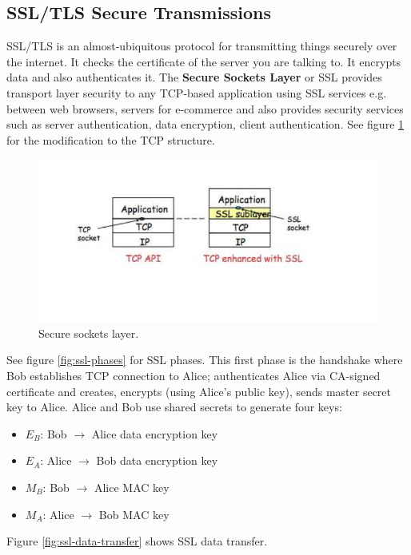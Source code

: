 \documentclass[twoside]{article}
\begin{document}
\subsection{SSL/TLS Secure Transmissions}
SSL/TLS is an almost-ubiquitous protocol for transmitting things securely over
the internet. It checks the certificate of the server you are talking to. It 
encrypts data and also authenticates it. The \textbf{Secure Sockets Layer} or
SSL provides transport layer security to any TCP-based application using SSL
services e.g. between web browsers, servers for e-commerce and also provides
security services such as server authentication, data encryption, client 
authentication. See figure \ref{fig:ssl} for the modification to the TCP 
structure.
\begin{figure}
  \includegraphics[width=\linewidth]{ssl.png}
  \caption{Secure sockets layer.}
  \label{fig:ssl}
\end{figure}
See figure \ref{fig:ssl-phases} for SSL phases. This first phase is the 
handshake where Bob establishes TCP connection to Alice; authenticates Alice
via CA-signed certificate and creates, encrypts (using Alice's public key),
sends master secret key to Alice. Alice and Bob use shared secrets to generate
four keys:
\begin{itemize}
    \item \(E_B\): Bob \(\rightarrow\) Alice data encryption key
    \item \(E_A\): Alice \(\rightarrow\) Bob data encryption key
    \item \(M_B\): Bob \(\rightarrow\) Alice MAC key
    \item \(M_A\): Alice \(\rightarrow\) Bob MAC key
\end{itemize}
Figure \ref{fig:ssl-data-transfer} shows SSL data transfer.
\end{document}
